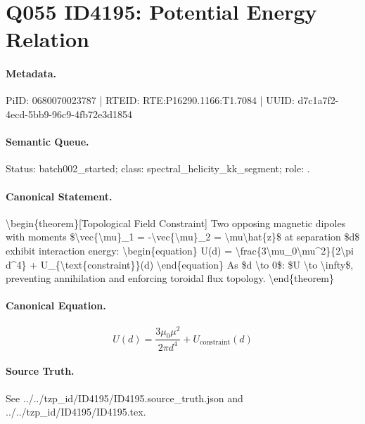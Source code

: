 \section*{Q055 ID4195: Potential Energy Relation}
\paragraph{Metadata.}
PiID: 0680070023787 | RTEID: RTE:P16290.1166:T1.7084 | UUID: d7c1a7f2-4ecd-5bb9-96c9-4fb72e3d1854

\paragraph{Semantic Queue.}
Status: batch002\_started; class: spectral\_helicity\_kk\_segment; role: .

\paragraph{Canonical Statement.}
\textbackslash{}begin\{theorem\}[Topological Field Constraint] Two opposing magnetic dipoles with moments \$\textbackslash{}vec\{\textbackslash{}mu\}\_1 = -\textbackslash{}vec\{\textbackslash{}mu\}\_2 = \textbackslash{}mu\textbackslash{}hat\{z\}\$ at separation \$d\$ exhibit interaction energy: \textbackslash{}begin\{equation\} U(d) = \textbackslash{}frac\{3\textbackslash{}mu\_0\textbackslash{}mu\textasciicircum{}2\}\{2\textbackslash{}pi d\textasciicircum{}4\} + U\_\{\textbackslash{}text\{constraint\}\}(d) \textbackslash{}end\{equation\} As \$d \textbackslash{}to 0\$: \$U \textbackslash{}to \textbackslash{}infty\$, preventing annihilation and enforcing toroidal flux topology. \textbackslash{}end\{theorem\}

\paragraph{Canonical Equation.}
\[
\begin{equation} U(d) = \frac{3\mu_0\mu^2}{2\pi d^4} + U_{\text{constraint}}(d) \end{equation}
\]

\paragraph{Source Truth.}
See ../../tzp\_id/ID4195/ID4195.source\_truth.json and ../../tzp\_id/ID4195/ID4195.tex.
